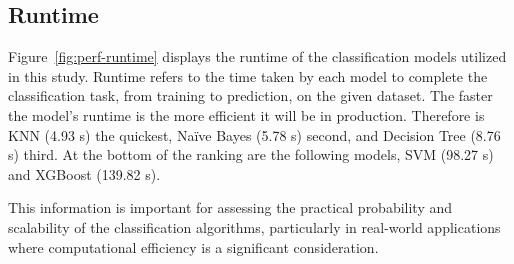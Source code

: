\break

\subsection{Runtime}


Figure~\ref{fig:perf-runtime} displays the runtime of the classification models utilized in this study. Runtime refers to the time taken by each model to complete the classification task, from training to prediction, on the given dataset. The faster the model’s runtime is the more efficient it will be in production. Therefore is KNN (4.93 s) the quickest, Naïve Bayes (5.78 s) second, and Decision Tree (8.76 s) third. At the bottom of the ranking are the following models, SVM (98.27 s) and XGBoost (139.82 s).

This information is important for assessing the practical probability and scalability of the classification algorithms, particularly in real-world applications where computational efficiency is a significant consideration.
